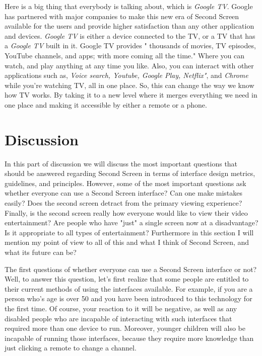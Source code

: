 \documentclass[12pt, oneside]{amsart}   	%
\begin{document}
Here is a big thing that everybody is talking about, which is  \emph{Google TV}.  Google has partnered with major companies to make this new era of Second Screen available for the users and provide higher satisfaction than any other application and devices.   \emph{Google TV} is either a device connected to the TV, or a TV that has a  \emph{Google TV} built in it.  Google TV provides " thousands of movies, TV episodes, YouTube channels, and apps; with more coming all the time."\cite{Google} Where you can watch, and play anything at any time you like.  Also, you can interact with other applications such as,  \emph{Voice search, Youtube, Google Play, Netflix"},  and  \emph{Chrome} while you're watching TV, all in one place.  So, this can change the way we know how TV works. By taking it to a new level where it merges everything we need in one place and making it accessible by either a remote or a phone.

 \section{Discussion}
 In this part of discussion we will discuss the most important questions that should be answered regarding Second Screen in terms of interface design metrics, guidelines, and principles.  However, some of the most important questions ask whether everyone can use a Second Screen interface? Can one make mistakes easily? Does the second screen detract from the primary viewing experience?  Finally, is the second screen really how everyone would like to view their video entertainment? Are people who have "just" a single screen now at a disadvantage? Is it appropriate to all types of entertainment?  Furthermore in this section I will mention my point of view to all of this and what I think of Second Screen, and what its future can be?
 
 The first questions of whether everyone can use a Second Screen interface or not?  Well, to answer this question, let's first realize that some people are entitled to their current methods of using the interfaces available.  For example, if you are a person who's age is over 50 and you have been introduced to this technology for the first time.  Of course, your reaction to it will be negative, as well as any disabled people who are incapable of interacting with such interfaces that required more than one device to run.  Moreover, younger children will also be incapable of running those interfaces, because they require more knowledge than just clicking a remote to change a channel. 
 
\end{document}
